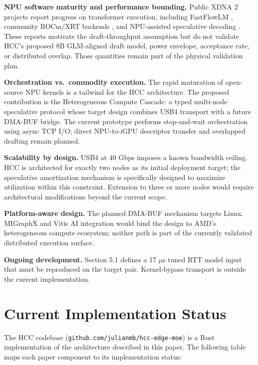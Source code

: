 \documentclass[11pt,a4paper]{article}
\begin{document}
\textbf{NPU software maturity and performance bounding.} Public XDNA 2 projects report progress on transformer execution, including FastFlowLM \cite{fastflowlm}, community ROCm/XRT backends \cite{dragonnpu}, and NPU-assisted speculative decoding \cite{sdnpu}. These reports motivate the draft-throughput assumption but do not validate HCC's proposed 8B GLM-aligned draft model, power envelope, acceptance rate, or distributed overlap. Those quantities remain part of the physical validation plan.

\textbf{Orchestration vs.\ commodity execution.} The rapid maturation of open-source NPU kernels is a tailwind for the HCC architecture. The proposed contribution is the Heterogeneous Compute Cascade: a typed multi-node speculative protocol whose target design combines USB4 transport with a future DMA-BUF bridge. The current prototype performs stop-and-wait orchestration using async TCP I/O; direct NPU-to-iGPU descriptor transfer and overlapped drafting remain planned.

\textbf{Scalability by design.} USB4 at 40 Gbps imposes a known bandwidth ceiling. HCC is architected for exactly two nodes as its initial deployment target; the speculative amortization mechanism is specifically designed to maximize utilization within this constraint. Extension to three or more nodes would require architectural modifications beyond the current scope.

\textbf{Platform-aware design.} The planned DMA-BUF mechanism targets Linux. MIGraphX and Vitis AI integration would bind the design to AMD's heterogeneous compute ecosystem; neither path is part of the currently validated distributed execution surface.

\textbf{Ongoing development.} Section 5.1 defines a 17 $\mu$s tuned RTT model input that must be reproduced on the target pair. Kernel-bypass transport is outside the current implementation.


\section{Current Implementation Status}
\label{sec:implementation}

The HCC codebase (\texttt{github.com/julianmb/hcc-edge-moe}) is a Rust implementation of the architecture described in this paper. The following table maps each paper component to its implementation status:
\end{document}
